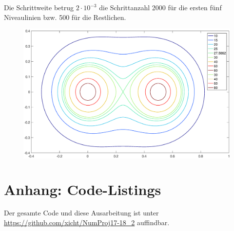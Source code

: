 \documentclass[a4paper,11pt,bibliography=totoc,listof=totoc,headinclude=true,cleardoublepage=empty,oneside]{scrartcl}
\newcommand{\R}{\mathbb{R}}
\begin{document}
Die Schrittweite betrug $2\cdot 10^{-3}$ die Schrittanzahl 2000 für die ersten fünf Niveaulinien bzw. 500 für die Restlichen.

\begin{figure}[H]
	\centering
	\includegraphics[trim = 41mm 0mm 35mm 0mm, clip, width=\linewidth]{plots/niveau/test5_}
	\label{fig:nivlines}
\end{figure}

\section{Anhang: Code-Listings}
Der gesamte Code und diese Ausarbeitung ist unter \url{https://github.com/xicht/NumProj17-18_2} auffindbar.
%
\end{document}
